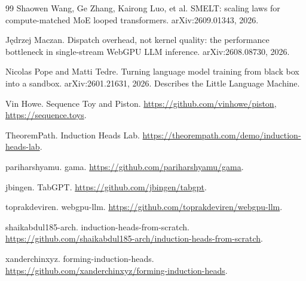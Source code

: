\documentclass[10pt]{article}
\begin{document}
\begin{thebibliography}{99}
Shaowen Wang, Ge Zhang, Kairong Luo, et al.
\newblock SMELT: scaling laws for compute-matched MoE looped transformers.
\newblock arXiv:2609.01343, 2026.

J\k{e}drzej Maczan.
\newblock Dispatch overhead, not kernel quality: the performance bottleneck in single-stream WebGPU LLM inference.
\newblock arXiv:2608.08730, 2026.

Nicolas Pope and Matti Tedre.
\newblock Turning language model training from black box into a sandbox.
\newblock arXiv:2601.21631, 2026. Describes the Little Language Machine.

Vin Howe.
\newblock Sequence Toy and Piston.
\newblock \url{https://github.com/vinhowe/piston}, \url{https://sequence.toys}.

TheoremPath.
\newblock Induction Heads Lab.
\newblock \url{https://theorempath.com/demo/induction-heads-lab}.

pariharshyamu.
\newblock gama.
\newblock \url{https://github.com/pariharshyamu/gama}.

jbingen.
\newblock TabGPT.
\newblock \url{https://github.com/jbingen/tabgpt}.

toprakdeviren.
\newblock webgpu-llm.
\newblock \url{https://github.com/toprakdeviren/webgpu-llm}.

shaikabdul185-arch.
\newblock induction-heads-from-scratch.
\newblock \url{https://github.com/shaikabdul185-arch/induction-heads-from-scratch}.

xanderchinxyz.
\newblock forming-induction-heads.
\newblock \url{https://github.com/xanderchinxyz/forming-induction-heads}.

\end{thebibliography}
\end{document}

